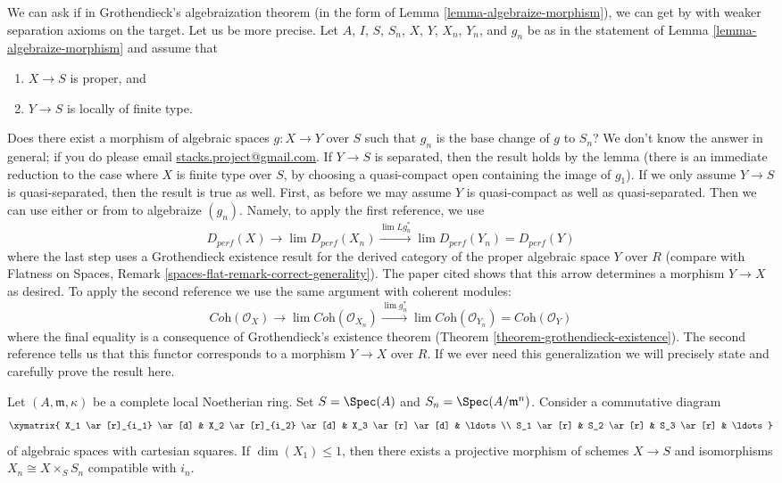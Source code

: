 \begin{remark}
\label{remark-weaken-separation-axioms-question}
We can ask if in Grothendieck's algebraization theorem (in the form
of Lemma \ref{lemma-algebraize-morphism}), we can get
by with weaker separation axioms on the target. Let us be more precise.
Let $A$, $I$, $S$, $S_n$, $X$, $Y$, $X_n$, $Y_n$, and $g_n$ be as in
the statement of Lemma \ref{lemma-algebraize-morphism} and assume that
\begin{enumerate}
\item $X \to S$ is proper, and
\item $Y \to S$ is locally of finite type.
\end{enumerate}
Does there exist a morphism of algebraic spaces $g : X \to Y$
over $S$ such that $g_n$ is the base change of $g$ to $S_n$?
We don't know the answer in general; if you do please email
\href{mailto:stacks.project@gmail.com}{stacks.project@gmail.com}.
If $Y \to S$ is separated, then the result
holds by the lemma (there is an immediate reduction to the case
where $X$ is finite type over $S$, by choosing a quasi-compact
open containing the image of $g_1$). If we only assume $Y \to S$
is quasi-separated, then the result is true as well. First, as before
we may assume $Y$ is quasi-compact as well as quasi-separated.
Then we can use either \cite{Bhatt-Algebraize} or from
\cite{Hall-Rydh-coherent} to algebraize $(g_n)$. Namely, to apply
the first reference, we use
$$
D_{perf}(X) \to \lim D_{perf}(X_n)
\xrightarrow{\lim Lg_n^*}
\lim D_{perf}(Y_n) = D_{perf}(Y)
$$
where the last step uses a Grothendieck existence result for
the derived category of the proper algebraic space $Y$ over $R$
(compare with
Flatness on Spaces, Remark \ref{spaces-flat-remark-correct-generality}).
The paper cited shows that
this arrow determines a morphism $Y \to X$ as desired. To apply the
second reference we use the same argument with coherent modules:
$$
\textit{Coh}(\mathcal{O}_X) \to \lim \textit{Coh}(\mathcal{O}_{X_n})
\xrightarrow{\lim g_n^*}
\lim \textit{Coh}(\mathcal{O}_{Y_n}) = \textit{Coh}(\mathcal{O}_Y)
$$
where the final equality is a consequence of Grothendieck's
existence theorem (Theorem \ref{theorem-grothendieck-existence}).
The second reference tells us that this functor corresponds to a
morphism $Y \to X$ over $R$. If we ever need this generalization
we will precisely state and carefully prove the result here.
\end{remark}

\begin{lemma}
\label{lemma-formal-algebraic-space-proper-reldim-1}
Let $(A, \mathfrak m, \kappa)$ be a complete local Noetherian ring.
Set $S = \Spec(A)$ and $S_n = \Spec(A/\mathfrak m^n)$.
Consider a commutative diagram
$$
\xymatrix{
X_1 \ar[r]_{i_1} \ar[d] & X_2 \ar[r]_{i_2} \ar[d] & X_3 \ar[r] \ar[d] &
\ldots \\
S_1 \ar[r] & S_2 \ar[r] & S_3 \ar[r] & \ldots
}
$$
of algebraic spaces with cartesian squares. If $\dim(X_1) \leq 1$,
then there exists a projective morphism of schemes $X \to S$
and isomorphisms $X_n \cong X \times_S S_n$ compatible with $i_n$.
\end{lemma}

